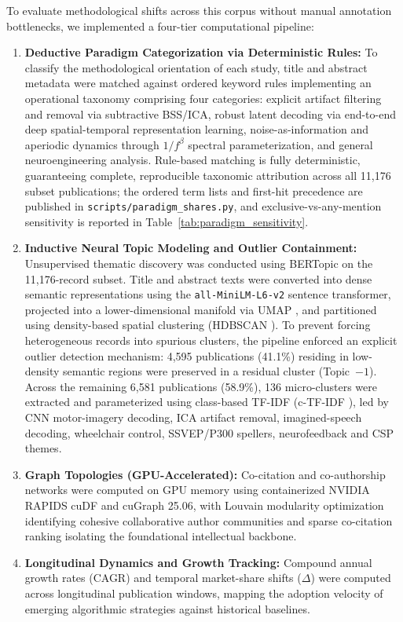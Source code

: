 \documentclass[preprint,12pt]{elsarticle}
\begin{document}
To evaluate methodological shifts across this corpus without manual annotation bottlenecks, we implemented a four-tier computational pipeline:
\begin{enumerate}
    \item \textbf{Deductive Paradigm Categorization via Deterministic Rules:} To classify the methodological orientation of each study, title and abstract metadata were matched against ordered keyword rules implementing an operational taxonomy comprising four categories: explicit artifact filtering and removal via subtractive BSS/ICA, robust latent decoding via end-to-end deep spatial-temporal representation learning, noise-as-information and aperiodic dynamics through $1/f^\beta$ spectral parameterization, and general neuroengineering analysis. Rule-based matching is fully deterministic, guaranteeing complete, reproducible taxonomic attribution across all 11,176 subset publications; the ordered term lists and first-hit precedence are published in \nolinkurl{scripts/paradigm_shares.py}, and exclusive-vs-any-mention sensitivity is reported in Table~\ref{tab:paradigm_sensitivity}.
    \item \textbf{Inductive Neural Topic Modeling and Outlier Containment:} Unsupervised thematic discovery was conducted using BERTopic on the 11,176-record subset. Title and abstract texts were converted into dense semantic representations using the \texttt{all-MiniLM-L6-v2} sentence transformer, projected into a lower-dimensional manifold via UMAP \cite{mcinnes2018umap}, and partitioned using density-based spatial clustering (HDBSCAN \cite{campello2013density}). To prevent forcing heterogeneous records into spurious clusters, the pipeline enforced an explicit outlier detection mechanism: 4,595 publications (41.1\%) residing in low-density semantic regions were preserved in a residual cluster (Topic~$-1$). Across the remaining 6,581 publications (58.9\%), 136 micro-clusters were extracted and parameterized using class-based TF-IDF (c-TF-IDF \cite{grootendorst2022bertopic}), led by CNN motor-imagery decoding, ICA artifact removal, imagined-speech decoding, wheelchair control, SSVEP/P300 spellers, neurofeedback and CSP themes.
    \item \textbf{Graph Topologies (GPU-Accelerated):} Co-citation and co-authorship networks were computed on GPU memory using containerized NVIDIA RAPIDS cuDF and cuGraph 25.06, with Louvain modularity optimization \cite{blondel2008fast} identifying cohesive collaborative author communities and sparse co-citation ranking isolating the foundational intellectual backbone.
    \item \textbf{Longitudinal Dynamics and Growth Tracking:} Compound annual growth rates (CAGR) and temporal market-share shifts ($\Delta$) were computed across longitudinal publication windows, mapping the adoption velocity of emerging algorithmic strategies against historical baselines.
\end{enumerate}
\end{document}
